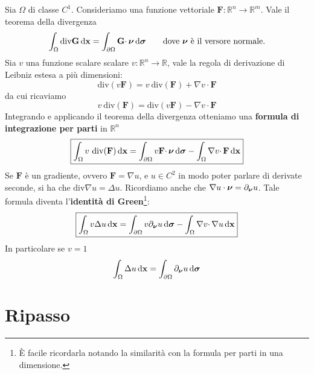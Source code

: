 Sia $\Omega $ di classe $C^{1}$. Consideriamo una funzione vettoriale $\mathbf{F}:\mathbb{R}^{n}\to\mathbb{R}^{m}$. Vale il teorema della divergenza
\begin{equation*}
    \int _{\Omega }\mathrm{div}\mathbf{G}\,\mathrm d \mathbf{x}=\int _{\partial \Omega }\mathbf{G} \cdotp \bm{\nu}\,\mathrm d \bm{\sigma} \qquad \text{dove}\ \bm{\nu}\ \text{è il versore normale.}
\end{equation*}
Sia $v$ una funzione scalare scalare $v:\mathbb{R}^{n}\to \mathbb{R}$, vale la regola di derivazione di Leibniz estesa a più dimensioni:
\begin{equation*}
    \mathrm{div}(v\mathbf{F}) =v\ \mathrm{div}(\mathbf{F}) +\nabla v\cdotp \mathbf{F}
\end{equation*}
da cui ricaviamo
\begin{equation*}
    v\ \mathrm{div}(\mathbf{F}) = \mathrm{div}(v\mathbf{F}) -\nabla v\cdotp \mathbf{F}
\end{equation*}
Integrando e applicando il teorema della divergenza otteniamo una \textbf{formula di integrazione per parti} in $\mathbb{R}^{n}$
\begin{equation}
    \boxed{\int _{\Omega } v\ \mathrm{div}(\mathbf{F}) \dxx = \int _{\partial \Omega } v\mathbf{F} \cdotp \nuu \dsig -\int _{\Omega } \nabla v\cdotp \mathbf{F}\dxx}
\end{equation}
Se $\mathbf{F}$ è un gradiente, ovvero $\mathbf{F} =\nabla u$, e $u\in C^{2}$ in modo poter parlare di derivate seconde, si ha che $\mathrm{div} \nabla u=\Delta u$. Ricordiamo anche che $\nabla u\cdot\bm{\nu} = \partial_{\bm{\nu}}u$. Tale formula diventa l'\textbf{identità di Green}\footnote{È facile ricordarla notando la similarità con la formula per parti in una dimensione.}:
\begin{equation}
    \boxed{\int _{\Omega } v\Delta u\,\mathrm d \mathbf{x}= \int _{\partial \Omega } v\partial _{\bm{\nu}} u\,\mathrm d \bm{\sigma} - \int _{\Omega } \nabla v\cdotp \nabla u\,\mathrm d \mathbf{x}}
    \label{eq:id-green}
\end{equation}
In particolare se $v=1$
\begin{equation}
    \int _{\Omega } \Delta u\,\mathrm d \mathbf{x}=\int _{\partial \Omega } \partial _{\bm{\nu}} u\,\mathrm d \bm{\sigma}
    \label{eq:id-green-v1}
\end{equation}
\section{Ripasso}

